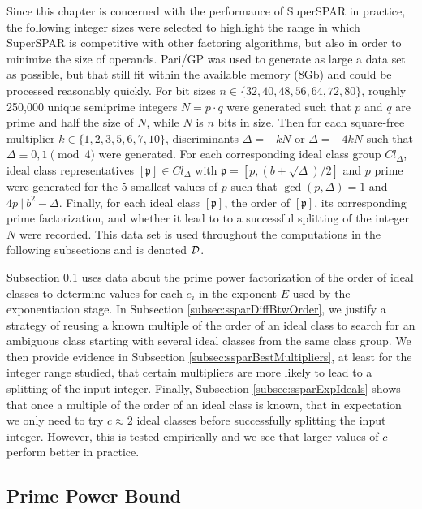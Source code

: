 \documentclass{ucalgthes1}
\theoremstyle{definition}
\newcommand{\ideal}{\mathfrak}
\newcommand{\idealclass}[1]{\left[ \ideal #1 \right]}
\begin{document}
Since this chapter is concerned with the performance of SuperSPAR in practice, the following integer sizes were selected to highlight the range in which SuperSPAR is competitive with other factoring algorithms, but also in order to minimize the size of operands.  Pari/GP was used to generate as large a data set as possible, but that still fit within the available memory (8Gb) and could be processed reasonably quickly.  For bit sizes $n \in \{32, 40, 48, 56, 64, 72, 80\}$, roughly 250,000 unique semiprime integers $N = p \cdot q$ were generated such that $p$ and $q$ are prime and half the size of $N$, while $N$ is $n$ bits in size.  Then for each square-free multiplier $k \in \{1, 2, 3, 5, 6, 7, 10\}$, discriminants $\Delta = -kN$ or $\Delta = -4kN$ such that $\Delta \equiv 0, 1 \pmod 4$ were generated.  For each corresponding ideal class group $Cl_\Delta$, ideal class representatives $\idealclass p \in Cl_\Delta$ with $\ideal p = [p, (b+\sqrt\Delta)/2]$ and $p$ prime were generated for the 5 smallest values of $p$ such that $\gcd(p, \Delta) = 1$ and $4p ~|~ b^2 - \Delta$.  Finally, for each ideal class $\idealclass p$, the order of $\idealclass p$, its corresponding prime factorization, and whether it lead to to a successful splitting of the integer $N$ were recorded.  This data set is used throughout the computations in the following subsections and is denoted $\mathcal D$.

Subsection \ref{subsec:ssparPrimePowerBound} uses data about the prime power factorization of the order of ideal classes to determine values for each $e_i$ in the exponent $E$ used by the exponentiation stage.  In Subsection \ref{subsec:ssparDiffBtwOrder}, we justify a strategy of reusing a known multiple of the order of an ideal class to search for an ambiguous class starting with several ideal classes from the same class group.  We then provide evidence in Subsection \ref{subsec:ssparBestMultipliers}, at least for the integer range studied, that certain multipliers are more likely to lead to a splitting of the input integer.  Finally, Subsection \ref{subsec:ssparExpIdeals} shows that once a multiple of the order of an ideal class is known, that in expectation we only need to try $c \approx 2$ ideal classes before successfully splitting the input integer.  However, this is tested empirically and we see that larger values of $c$ perform better in practice.


\subsection{Prime Power Bound}
\label{subsec:ssparPrimePowerBound}
\end{document}
